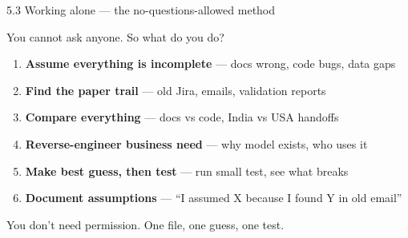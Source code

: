 \documentclass[aspectratio=169, 11pt]{beamer}
\begin{document}
\begin{frame}{5.3 Working alone — the no-questions-allowed method}
	\begin{block}{You cannot ask anyone. So what do you do?}
		\scriptsize
		\begin{enumerate}
			\item \textbf{Assume everything is incomplete} — docs wrong, code bugs, data gaps
			\item \textbf{Find the paper trail} — old Jira, emails, validation reports
			\item \textbf{Compare everything} — docs vs code, India vs USA handoffs
			\item \textbf{Reverse-engineer business need} — why model exists, who uses it
			\item \textbf{Make best guess, then test} — run small test, see what breaks
			\item \textbf{Document assumptions} — ``I assumed X because I found Y in old email''
		\end{enumerate}
	\end{block}
	
	\vspace{0.05cm}
	\tiny\alert{You don't need permission. One file, one guess, one test.}
\end{frame}
	
	
	
\end{document}
